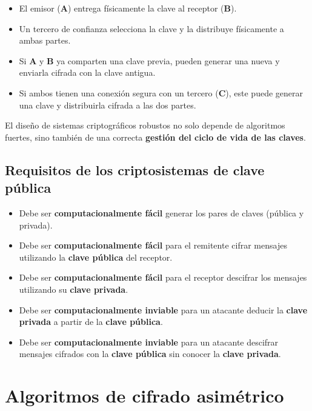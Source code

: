 \documentclass[11pt,a4paper]{article}
\begin{document}
\begin{itemize}
    \item El emisor (\textbf{A}) entrega físicamente la clave al receptor (\textbf{B}).
    \item Un tercero de confianza selecciona la clave y la distribuye físicamente a ambas partes.
    \item Si \textbf{A} y \textbf{B} ya comparten una clave previa, pueden generar una nueva y enviarla cifrada con la clave antigua.
    \item Si ambos tienen una conexión segura con un tercero (\textbf{C}), este puede generar una clave y distribuirla cifrada a las dos partes.
\end{itemize}

\begin{RecordatorioBox}
El diseño de sistemas criptográficos robustos no solo depende de algoritmos fuertes, sino también de una correcta \textbf{gestión del ciclo de vida de las claves}.
\end{RecordatorioBox}

\subsection*{Requisitos de los criptosistemas de clave pública}

\begin{itemize}
    \item Debe ser \textbf{computacionalmente fácil} generar los pares de claves (pública y privada).
    \item Debe ser \textbf{computacionalmente fácil} para el remitente cifrar mensajes utilizando la \textbf{clave pública} del receptor.
    \item Debe ser \textbf{computacionalmente fácil} para el receptor descifrar los mensajes utilizando su \textbf{clave privada}.
    \item Debe ser \textbf{computacionalmente inviable} para un atacante deducir la \textbf{clave privada} a partir de la \textbf{clave pública}.
    \item Debe ser \textbf{computacionalmente inviable} para un atacante descifrar mensajes cifrados con la \textbf{clave pública} sin conocer la \textbf{clave privada}.
\end{itemize}

\section{Algoritmos de cifrado asimétrico}
\end{document}
